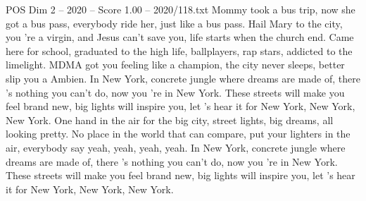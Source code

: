 \begin{textsample}{POS Dim 2 – 2020 – Score 1.00 – 2020/118.txt}
Mommy took a bus trip, now she got a bus pass, everybody ride her, just like a bus pass.
Hail Mary to the city, you 're a virgin, and Jesus can't save you, life starts when the church end.
Came here for school, graduated to the high life, ballplayers, rap stars, addicted to the limelight.
MDMA got you feeling like a champion, the city never sleeps, better slip you a Ambien.
In New York, concrete jungle where dreams are made of, there 's nothing you can't do, now you 're in New York.
These streets will make you feel brand new, big lights will inspire you, let 's hear it for New York, New York, New York.
One hand in the air for the big city, street lights, big dreams, all looking pretty.
No place in the world that can compare, put your lighters in the air, everybody say yeah, yeah, yeah, yeah.
In New York, concrete jungle where dreams are made of, there 's nothing you can't do, now you 're in New York.
These streets will make you feel brand new, big lights will inspire you, let 's hear it for New York, New York, New York.

\end{textsample}
